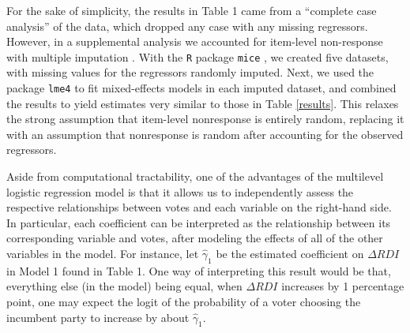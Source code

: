\documentclass[11pt]{article}
\begin{document}

For the sake of simplicity, the results in Table 1 came from a ``complete case analysis'' of the data, which dropped any case with any missing regressors. However, in a supplemental analysis we accounted for item-level non-response with multiple imputation \citep{rubin2004multiple}.
With the \verb|R| package \verb|mice| \citep{mice}, we created five datasets, with missing values for the regressors randomly imputed.
Next, we used the package \verb|lme4| \citep{lme4} to fit mixed-effects models in each imputed dataset, and combined the results to yield estimates very similar to those in Table \ref{results}.
This relaxes the strong assumption that item-level nonresponse is entirely random, replacing it with an assumption that nonresponse is random after accounting for the observed regressors.

Aside from computational tractability, one of the advantages of the
multilevel logistic regression model is that it allows us to independently assess
the %
 respective relationships between votes and each variable on the
right-hand side.
In particular, each coefficient can be interpreted as the relationship
between its corresponding variable and votes, after modeling the effects of all of the other variables in the model.
For instance, let $\hat{\gamma}_{1}$ be the estimated coefficient on $\Delta RDI$ in Model 1 found in Table 1. %
One way of interpreting this result would be that, everything else (in
the model) being equal, when $\Delta RDI$ increases by 1 percentage
point, one may expect the logit of the probability of a voter choosing
the incumbent party to increase by about $\hat{\gamma}_{1}$.
\end{document}
